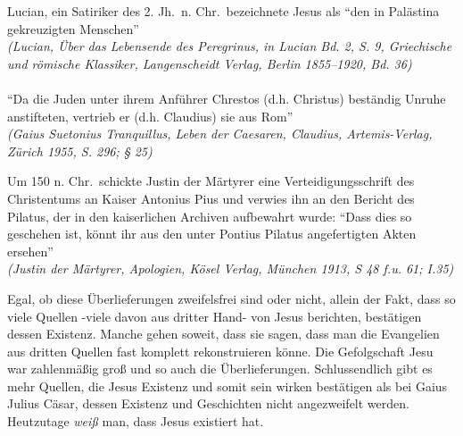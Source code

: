 \begin{center}
\begin{minipage}{0.9\linewidth}
        Lucian, ein Satiriker des 2. Jh.\ n. Chr.\ bezeichnete Jesus als ``den in Palästina gekreuzigten Menschen''
        \\ \footnotesize \textit{(Lucian, Über das Lebensende des Peregrinus, in Lucian Bd. 2, S. 9, Griechische und römische Klassiker, Langenscheidt Verlag, Berlin 1855--1920, Bd. 36)} \small
        \\~\\
        ``Da die Juden unter ihrem Anführer Chrestos (d.h. Christus) beständig Unruhe anstifteten, vertrieb er (d.h. Claudius) sie aus Rom''
        \\ \footnotesize \textit{(Gaius Suetonius Tranquillus, Leben der Caesaren, Claudius, Artemis-Verlag, Zürich 1955, S. 296; § 25)} \small
    \end{minipage}
\end{center}

\begin{center}
    \begin{minipage}{0.9\linewidth}
        \small
        Um 150 n. Chr.\ schickte Justin der Märtyrer eine Verteidigungsschrift des Christentums an Kaiser Antonius Pius und verwies ihn an den Bericht des Pilatus, der in den kaiserlichen  Archiven aufbewahrt wurde: ``Dass dies so geschehen ist, könnt ihr aus den unter Pontius Pilatus angefertigten Akten ersehen''
        \\ \footnotesize \textit{(Justin der Märtyrer, Apologien, Kösel Verlag, München 1913, S 48 f.u. 61; I.35)} \normalsize
    \end{minipage}
\end{center}
\medskip
Egal, ob diese Überlieferungen zweifelsfrei sind oder nicht, allein der Fakt, dass so viele Quellen -viele davon aus dritter Hand- von Jesus berichten, bestätigen dessen Existenz. Manche gehen soweit, dass sie sagen, dass man die Evangelien aus dritten Quellen fast komplett rekonstruieren könne. Die Gefolgschaft Jesu war zahlenmäßig groß und so auch die Überlieferungen. Schlussendlich gibt es mehr Quellen, die Jesus Existenz und somit sein wirken bestätigen als bei Gaius Julius Cäsar, dessen Existenz und Geschichten nicht angezweifelt werden. Heutzutage \emph{weiß} man, dass Jesus existiert hat.


